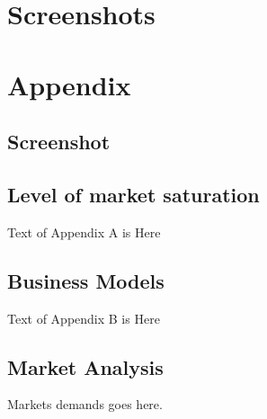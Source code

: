 \documentclass[a4paper,12pt,fleqn,dvipsnames,oneside,openright]{memoir}
\begin{document}
\chapter{Screenshots}

\begingroup
	\raggedright
	\printbibliography
\endgroup 


\appendix
\chapter{Appendix}
\section{Screenshot}
\label{Screenshot}



\section{Level of market saturation}
Text of Appendix A is Here

\section{Business Models}
\label{Hejsa}
Text of Appendix B is Here

\section{Market Analysis}
Markets demands goes here. 
\end{document}
